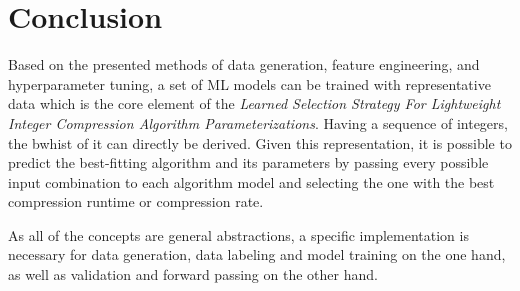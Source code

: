 \section{Conclusion}
Based on the presented methods of data generation, feature engineering, and hyperparameter tuning, a set of ML models can be trained with representative data which is the core element of the \emph{Learned Selection Strategy For Lightweight Integer Compression Algorithm Parameterizations}. Having a sequence of integers, the bwhist of it can directly be derived. Given this representation, it is possible to predict the best-fitting algorithm and its parameters by passing every possible input combination to each algorithm model and selecting the one with the best compression runtime or compression rate. 

As all of the concepts are general abstractions, a specific implementation is necessary for data generation, data labeling and model training on the one hand, as well as validation and forward passing on the other hand.  
